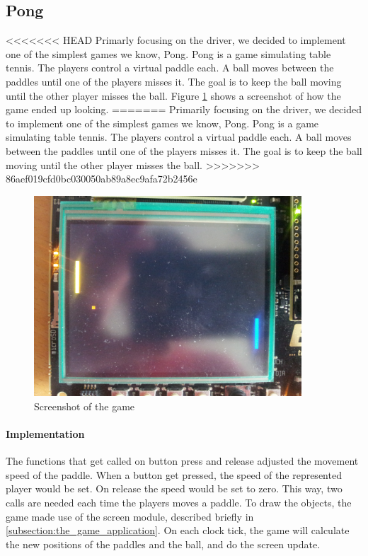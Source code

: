 \subsection{Pong}
\label{subsection:pong}
<<<<<<< HEAD
Primarly focusing on the driver, we decided to implement one of the simplest games we know, Pong. Pong is a game simulating table tennis. The players control a virtual paddle each. A ball moves between the paddles until one of the players misses it. The goal is to keep the ball moving until the other player misses the ball. Figure \ref{fig:pong_screenshot} shows a screenshot of how the game ended up looking.
=======
Primarily focusing on the driver, we decided to implement one of the simplest games we know, Pong. Pong is a game simulating table tennis. The players control a virtual paddle each. A ball moves between the paddles until one of the players misses it. The goal is to keep the ball moving until the other player misses the ball.
>>>>>>> 86aef019cfd0bc030050ab89a8ec9afa72b2456e

\begin{figure}[h]
	\label{fig:pong_screenshot}
	\centering
	\includegraphics[width=10cm]{img/pong_screen.jpg}
	\caption{Screenshot of the game}
\end{figure}

\paragraph{Implementation} The functions that get called on button press and release adjusted the movement speed of the paddle. When a button get pressed, the speed of the represented player would be set. On release the speed would be set to zero. This way, two calls are needed each time the players moves a paddle. To draw the objects, the game made use of the screen module, described briefly in \ref{subsection:the_game_application}. On each clock tick, the game will calculate the new positions of the paddles and the ball, and do the screen update.

